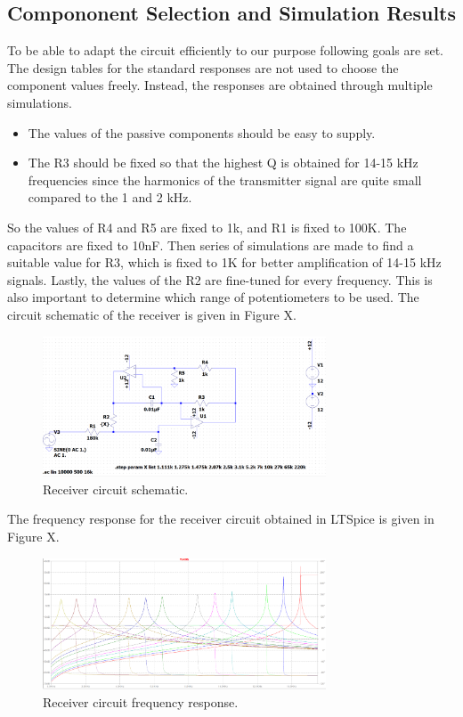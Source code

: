 \documentclass[letterpaper,12pt]{article}
\begin{document}
\subsection{Compononent Selection and Simulation Results}
To be able to adapt the circuit efficiently to our purpose following goals are set. The design tables for the standard responses are not used to choose the component values freely. Instead, the responses are obtained through multiple simulations.
\begin{itemize}
    \item The values of the passive components should be easy to supply.
    \item The R3 should be fixed so that the highest Q is obtained for 14-15 kHz frequencies since the harmonics of the transmitter signal are quite small compared to the 1 and 2 kHz.
\end{itemize}
So the values of R4 and R5 are fixed to 1k, and R1 is fixed to 100K. The capacitors are fixed to 10nF. Then series of simulations are made to find a suitable value for R3, which is fixed to 1K for better amplification of 14-15 kHz signals. Lastly, the values of the R2 are fine-tuned for every frequency. This is also important to determine which range of potentiometers to be used. The circuit schematic of the receiver is given in Figure X.
\begin{figure}[H]
    \centering
    \includegraphics[width = 0.75\textwidth]{receiver_schematic.png}
    \caption{Receiver circuit schematic.}
\end{figure}

The frequency response for the receiver circuit obtained in LTSpice is given in Figure X.
\begin{figure}[H]
    \centering
    \includegraphics[width = 0.75\textwidth]{response.png}
    \caption{Receiver circuit frequency response.}
\end{figure}
\end{document}
